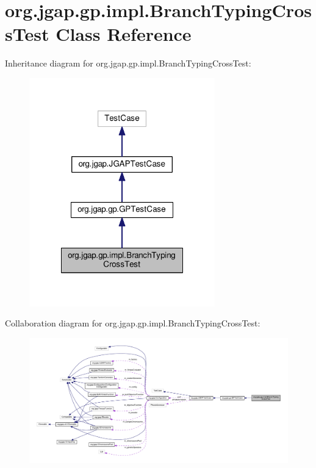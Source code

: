 \hypertarget{classorg_1_1jgap_1_1gp_1_1impl_1_1_branch_typing_cross_test}{\section{org.\-jgap.\-gp.\-impl.\-Branch\-Typing\-Cross\-Test Class Reference}
\label{classorg_1_1jgap_1_1gp_1_1impl_1_1_branch_typing_cross_test}
}


Inheritance diagram for org.\-jgap.\-gp.\-impl.\-Branch\-Typing\-Cross\-Test\-:
\nopagebreak
\begin{figure}[H]
\begin{center}
\leavevmode
\includegraphics[width=228pt]{classorg_1_1jgap_1_1gp_1_1impl_1_1_branch_typing_cross_test__inherit__graph}
\end{center}
\end{figure}


Collaboration diagram for org.\-jgap.\-gp.\-impl.\-Branch\-Typing\-Cross\-Test\-:
\nopagebreak
\begin{figure}[H]
\begin{center}
\leavevmode
\includegraphics[width=350pt]{classorg_1_1jgap_1_1gp_1_1impl_1_1_branch_typing_cross_test__coll__graph}
\end{center}
\end{figure}
